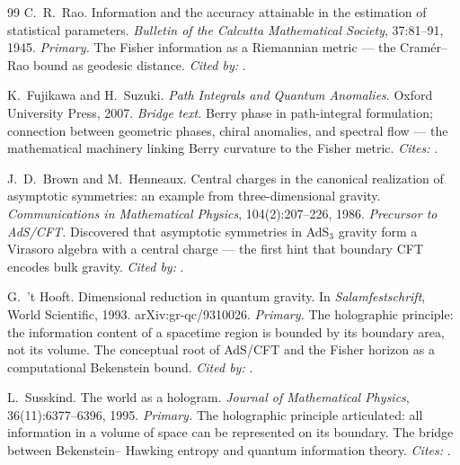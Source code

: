 \documentclass[12pt,a4paper]{article}
\begin{document}
\begin{thebibliography}{99}
C.~R.~Rao.
\newblock Information and the accuracy attainable in the estimation of statistical
parameters.
\newblock \emph{Bulletin of the Calcutta Mathematical Society}, 37:81--91, 1945.
\newblock \textit{Primary.} The Fisher information as a Riemannian metric --- the
Cram\'er--Rao bound as geodesic distance. \textit{Cited by:} \cite{amari2000}.

K.~Fujikawa and H.~Suzuki.
\newblock \emph{Path Integrals and Quantum Anomalies}.
\newblock Oxford University Press, 2007.
\newblock \textit{Bridge text.} Berry phase in path-integral formulation; connection between
geometric phases, chiral anomalies, and spectral flow --- the mathematical machinery
linking Berry curvature to the Fisher metric. \textit{Cites:} \cite{berry1984,amari2000}.

J.~D.~Brown and M.~Henneaux.
\newblock Central charges in the canonical realization of asymptotic symmetries:
an example from three-dimensional gravity.
\newblock \emph{Communications in Mathematical Physics}, 104(2):207--226, 1986.
\newblock \textit{Precursor to AdS/CFT.} Discovered that asymptotic symmetries in AdS$_3$
gravity form a Virasoro algebra with a central charge --- the first hint that
boundary CFT encodes bulk gravity. \textit{Cited by:} \cite{maldacena1999,ahs1999}.

G.~'t Hooft.
\newblock Dimensional reduction in quantum gravity.
\newblock In \emph{Salamfestschrift}, World Scientific, 1993. arXiv:gr-qc/9310026.
\newblock \textit{Primary.} The holographic principle: the information content of a
spacetime region is bounded by its boundary area, not its volume. The conceptual
root of AdS/CFT and the Fisher horizon as a computational Bekenstein bound.
\textit{Cited by:} \cite{susskind1995,maldacena1999}.

L.~Susskind.
\newblock The world as a hologram.
\newblock \emph{Journal of Mathematical Physics}, 36(11):6377--6396, 1995.
\newblock \textit{Primary.} The holographic principle articulated: all information in a
volume of space can be represented on its boundary. The bridge between Bekenstein--
Hawking entropy and quantum information theory. \textit{Cites:} \cite{thooft1993}.


\end{thebibliography}
\end{document}
